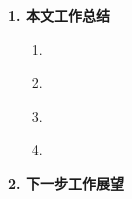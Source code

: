 \begin{summary}
\textbf{1. 本文工作总结}
\begin{itemize}
	\item[1.] 
	\item[2.] 
	\item[3.] 
	\item[4.] 
\end{itemize}

\textbf{2. 下一步工作展望}
\end{summary}